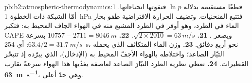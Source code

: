 \begin{solution}{pb:b2:atmospheric-thermodynamics:1}
قطعًا مستقيمة بدلالة $\ln p$ فتفوتها انحناءاتها. أمّا الشبكة ذات الخطوة \qty{1}{hPa} فتتبع المنحنيات. وتضيف الحرارة الافتراضية
طفو بخار الماء في الطرد، وهو أوفر في الطرد المشبع منه في
الهواء الجاف المحيط به: فتكبر CAPE ويصغر .
\textbf{21.} $\sqrt{2 \times 2010} = \qty{63}{m/s}$.
\textbf{22.} $10757 - 2711 = \qty{8046}{m}$ بسرعة $63.4/2 = \qty{31.7}{m/s}$: أي \qty{254}{s}، نحو أربع
دقائق.
\textbf{23.} وزن الماء المتكاثف الذي يحمله التيّار الصاعد؛ واختلاطه بالهواء الأجفّ
المحيط به (الإدخال)، الذي يبرّده إذ تتبخّر القطيرات.
\textbf{24.} تعطي نظرية الطرد التيّارَ الصاعد لعاصفة يغذّيها هذا الهواء سرعةً تقارب
\textbf{\qty[text-series-to-math=true]{63}{m.s^{-1}}}، وهي حدّ أعلى.
\end{solution}
